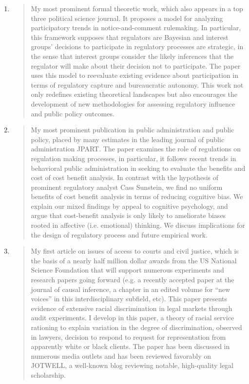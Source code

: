 \documentclass[12pt]{article}
\begin{document}
\begin{enumerate}
\item {}

\begin{quote}
My most prominent formal theoretic work, which also appears in a top three political science journal. It proposes a model for analyzing participatory trends in notice-and-comment rulemaking. In particular, this framework supposes that regulators are Bayesian and interest groups' decisions to participate in regulatory processes are strategic, in the sense that interest groups consider the likely inferences that the regulator will make about their decision not to participate. The paper uses this model to reevaluate existing evidence about participation in terms of regulatory capture and bureaucratic autonomy. This work not only redefines existing theoretical landscapes but also encourages the development of new methodologies for assessing regulatory influence and public policy outcomes.
\end{quote}

\item {}

\begin{quote}
My most prominent publication in public administration and public policy, placed by many estimates in the leading journal of public administration JPART. The paper examines the role of regulations on regulation making processes, in particular, it follows recent trends in behavioral public administration in seeking to evaluate the benefits and cost of cost benefit analysis. In contrast with the hypothesis of prominent regulatory analyst Cass Sunstein, we find no uniform benefits of cost benefit analysis in terms of reducing cognitive bias. We explain our mixed findings by appeal to cognitive psychology, and argue that cost-benefit analysis is only likely to ameliorate biases rooted in affective (i.e. emotional) thinking. We discuss implications for the design of regulatory process and future empirical work. 
\end{quote}

\item {}

\begin{quote}
My first article on issues of access to courts and civil justice, which is the basis of a nearly half million dollar awards from the US National Science Foundation that will support numerous experiments and research papers going forward (e.g. a recently accepted paper at the journal of causal inference, a chapter in an edited volume for “new voices” in this interdisciplinary subfield, etc). This paper presents evidence of extensive racial discrimination in legal markets through audit experiments. I develop in this paper, a theory of racial service rationing to explain variation in the degree of discrimination, observed in lawyers, decision to respond to request for representation from apparently white or black clients. The paper has been discussed in numerous media outlets and has been reviewed favorably on JOTWELL, a well-known blog reviewing notable, high-quality legal scholarship. 
\end{quote}

\end{enumerate}
\end{document}
